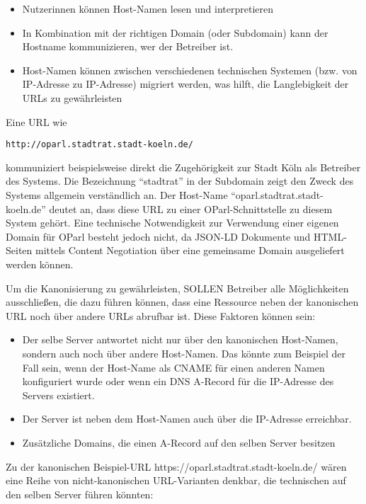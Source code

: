\documentclass[,a4paper]{article}
\begin{document}
\begin{itemize}
\itemsep1pt\parskip0pt
\item
  Nutzerinnen können Host-Namen lesen und interpretieren
\item
  In Kombination mit der richtigen Domain (oder Subdomain) kann der
  Hostname kommunizieren, wer der Betreiber ist.
\item
  Host-Namen können zwischen verschiedenen technischen Systemen (bzw.
  von IP-Adresse zu IP-Adresse) migriert werden, was hilft, die
  Langlebigkeit der URLs zu gewährleisten
\end{itemize}

Eine URL wie

\begin{verbatim}
http://oparl.stadtrat.stadt-koeln.de/
\end{verbatim}

kommuniziert beispielsweise direkt die Zugehörigkeit zur Stadt Köln als
Betreiber des Systems. Die Bezeichnung ``stadtrat'' in der Subdomain
zeigt den Zweck des Systems allgemein verständlich an. Der Host-Name
``oparl.stadtrat.stadt-koeln.de'' deutet an, dass diese URL zu einer
OParl-Schnittstelle zu diesem System gehört. Eine technische
Notwendigkeit zur Verwendung einer eigenen Domain für OParl besteht
jedoch nicht, da JSON-LD Dokumente und HTML-Seiten mittels Content
Negotiation über eine gemeinsame Domain ausgeliefert werden können.

Um die Kanonisierung zu gewährleisten, SOLLEN Betreiber alle
Möglichkeiten ausschließen, die dazu führen können, dass eine Ressource
neben der kanonischen URL noch über andere URLs abrufbar ist. Diese
Faktoren können sein:

\begin{itemize}
\item
  Der selbe Server antwortet nicht nur über den kanonischen Host-Namen,
  sondern auch noch über andere Host-Namen. Das könnte zum Beispiel der
  Fall sein, wenn der Host-Name als CNAME für einen anderen Namen
  konfiguriert wurde oder wenn ein DNS A-Record für die IP-Adresse des
  Servers existiert.
\item
  Der Server ist neben dem Host-Namen auch über die IP-Adresse
  erreichbar.
\item
  Zusätzliche Domains, die einen A-Record auf den selben Server besitzen
\end{itemize}

Zu der kanonischen Beispiel-URL https://oparl.stadtrat.stadt-koeln.de/
wären eine Reihe von nicht-kanonischen URL-Varianten denkbar, die
technischen auf den selben Server führen könnten:
\end{document}
